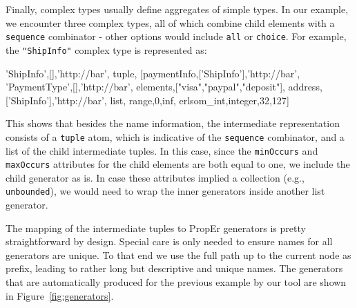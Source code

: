 \documentclass[copyright]{eptcs}
\begin{document}
Finally, complex types usually define aggregates of simple types. In
our example, we encounter three complex types, all of which combine
child elements with a \texttt{sequence} combinator - other options
would include \texttt{all} or \texttt{choice}. For example, the
\texttt{"ShipInfo"} complex type is represented as:

\begin{lstline}
{{'ShipInfo',[],'http://bar'},
  {tuple,
    [{{paymentInfo,['ShipInfo'],'http://bar'},
      {{'PaymentType',[],'http://bar'},
       {elements,["visa","paypal","deposit"]}}},
     {{address,['ShipInfo'],'http://bar'},
      {list, {{range,0,inf}, {erlsom_int,integer,{32,127}}}}}]}}
\end{lstline}

This shows that besides the name information, the intermediate
representation consists of a \texttt{tuple} atom, which is indicative
of the \texttt{sequence} combinator, and a list of the child
intermediate tuples. In this case, since the \texttt{minOccurs} and
\texttt{maxOccurs} attributes for the child elements are both equal to
one, we include the child generator as is. In case these attributes
implied a collection (e.g., \texttt{unbounded}), we would need to wrap
the inner generators inside another list generator.


The mapping of the intermediate tuples to PropEr generators is pretty
straightforward by design. Special care is only needed to ensure names
for all generators are unique. To that end we use the full path up to
the current node as prefix, leading to rather long but descriptive and
unique names. The generators that are automatically produced for the
previous example by our tool are shown in Figure~\ref{fig:generators}.
\end{document}
